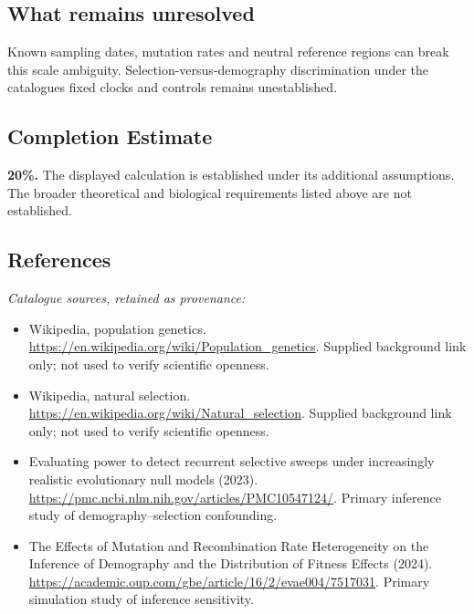\documentclass[11pt]{article}
\begin{document}
\subsection{What remains unresolved}
Known sampling dates, mutation rates and neutral reference regions can break this scale ambiguity. Selection-versus-demography discrimination under the catalogue\textquotesingle s fixed clocks and controls remains unestablished.
\subsection{Completion Estimate}
\textbf{20\%.} The displayed calculation is established under its additional assumptions. The broader theoretical and biological requirements listed above are not established.
\subsection{References}
\noindent\emph{Catalogue sources, retained as provenance:}
\begin{itemize}
\item Wikipedia, population genetics. \url{https://en.wikipedia.org/wiki/Population_genetics}. Supplied background link only; not used to verify scientific openness.
\item Wikipedia, natural selection. \url{https://en.wikipedia.org/wiki/Natural_selection}. Supplied background link only; not used to verify scientific openness.
\item Evaluating power to detect recurrent selective sweeps under increasingly realistic evolutionary null models (2023). \url{https://pmc.ncbi.nlm.nih.gov/articles/PMC10547124/}. Primary inference study of demography--selection confounding.
\item The Effects of Mutation and Recombination Rate Heterogeneity on the Inference of Demography and the Distribution of Fitness Effects (2024). \url{https://academic.oup.com/gbe/article/16/2/evae004/7517031}. Primary simulation study of inference sensitivity.
\end{itemize}
\end{document}
